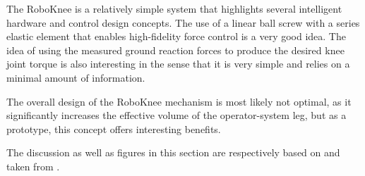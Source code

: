 \begin{refsection}
 The RoboKnee is a relatively simple system that highlights several intelligent hardware and control design concepts.  The use of a linear ball screw with a series elastic element that enables high-fidelity force control is a very good idea. The idea of using the measured ground reaction forces to produce the desired knee joint torque is also interesting in the sense that it is very simple and relies on a minimal amount of information.
 
 The overall design of the RoboKnee mechanism is most likely not optimal, as it significantly increases the effective volume of the operator-system leg, but as a prototype, this concept offers interesting benefits.
 
 The discussion as well as figures in this section are respectively based on and taken from \cite{robo_knee_2004}.  
 
\printbibliography[heading=subbibliography]

\end{refsection}

 
 
 
 
 

